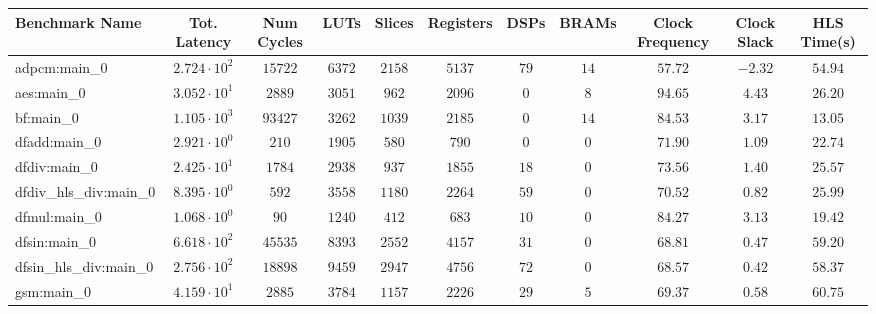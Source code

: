 \begin{tabular}{|l|c|c|c|c|c|c|c|c|c|c|}
\hline
Benchmark Name          & Tot. Latency           & Num Cycles & LUTs      & Slices    & Registers & DSPs    & BRAMs   & Clock Frequency & Clock Slack & HLS Time(s) \\
\hline
adpcm:main\_0           & $ 2.724 \cdot 10^{2} $ & $ 15722  $ & $ 6372  $ & $ 2158  $ & $ 5137  $ & $ 79  $ & $ 14  $ & $ 57.72       $ & $ -2.32   $ & $ 54.94   $ \\
aes:main\_0             & $ 3.052 \cdot 10^{1} $ & $ 2889   $ & $ 3051  $ & $ 962   $ & $ 2096  $ & $ 0   $ & $ 8   $ & $ 94.65       $ & $ 4.43    $ & $ 26.20   $ \\
bf:main\_0              & $ 1.105 \cdot 10^{3} $ & $ 93427  $ & $ 3262  $ & $ 1039  $ & $ 2185  $ & $ 0   $ & $ 14  $ & $ 84.53       $ & $ 3.17    $ & $ 13.05   $ \\
dfadd:main\_0           & $ 2.921 \cdot 10^{0} $ & $ 210    $ & $ 1905  $ & $ 580   $ & $ 790   $ & $ 0   $ & $ 0   $ & $ 71.90       $ & $ 1.09    $ & $ 22.74   $ \\
dfdiv:main\_0           & $ 2.425 \cdot 10^{1} $ & $ 1784   $ & $ 2938  $ & $ 937   $ & $ 1855  $ & $ 18  $ & $ 0   $ & $ 73.56       $ & $ 1.40    $ & $ 25.57   $ \\
dfdiv\_hls\_div:main\_0 & $ 8.395 \cdot 10^{0} $ & $ 592    $ & $ 3558  $ & $ 1180  $ & $ 2264  $ & $ 59  $ & $ 0   $ & $ 70.52       $ & $ 0.82    $ & $ 25.99   $ \\
dfmul:main\_0           & $ 1.068 \cdot 10^{0} $ & $ 90     $ & $ 1240  $ & $ 412   $ & $ 683   $ & $ 10  $ & $ 0   $ & $ 84.27       $ & $ 3.13    $ & $ 19.42   $ \\
dfsin:main\_0           & $ 6.618 \cdot 10^{2} $ & $ 45535  $ & $ 8393  $ & $ 2552  $ & $ 4157  $ & $ 31  $ & $ 0   $ & $ 68.81       $ & $ 0.47    $ & $ 59.20   $ \\
dfsin\_hls\_div:main\_0 & $ 2.756 \cdot 10^{2} $ & $ 18898  $ & $ 9459  $ & $ 2947  $ & $ 4756  $ & $ 72  $ & $ 0   $ & $ 68.57       $ & $ 0.42    $ & $ 58.37   $ \\
gsm:main\_0             & $ 4.159 \cdot 10^{1} $ & $ 2885   $ & $ 3784  $ & $ 1157  $ & $ 2226  $ & $ 29  $ & $ 5   $ & $ 69.37       $ & $ 0.58    $ & $ 60.75   $ \\

\end{tabular}
